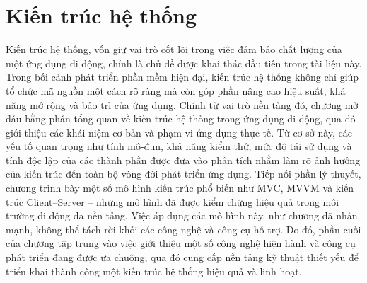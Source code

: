 
\chapter{Kiến trúc hệ thống}
\label{chap:Chap1}
\vspace{-0.8em}
Kiến trúc hệ thống, vốn giữ vai trò cốt lõi trong việc đảm bảo chất lượng của một ứng dụng di động, chính là chủ đề được khai thác đầu tiên trong tài liệu này. Trong bối cảnh phát triển phần mềm hiện đại, kiến trúc hệ thống không chỉ giúp tổ chức mã nguồn một cách rõ ràng mà còn góp phần nâng cao hiệu suất, khả năng mở rộng và bảo trì của ứng dụng. Chính từ vai trò nền tảng đó, chương mở đầu bằng phần tổng quan về kiến trúc hệ thống trong ứng dụng di động, qua đó giới thiệu các khái niệm cơ bản và phạm vi ứng dụng thực tế. Từ cơ sở này, các yếu tố quan trọng như tính mô-đun, khả năng kiểm thử, mức độ tái sử dụng và tính độc lập của các thành phần được đưa vào phân tích nhằm làm rõ ảnh hưởng của kiến trúc đến toàn bộ vòng đời phát triển ứng dụng. Tiếp nối phần lý thuyết, chương trình bày một số mô hình kiến trúc phổ biến như MVC, MVVM và kiến trúc Client–Server – những mô hình đã được kiểm chứng hiệu quả trong môi trường di động đa nền tảng. Việc áp dụng các mô hình này, như chương đã nhấn mạnh, không thể tách rời khỏi các công nghệ và công cụ hỗ trợ. Do đó, phần cuối của chương tập trung vào việc giới thiệu một số công nghệ hiện hành và công cụ phát triển đang được ưa chuộng, qua đó cung cấp nền tảng kỹ thuật thiết yếu để triển khai thành công một kiến trúc hệ thống hiệu quả và linh hoạt.










